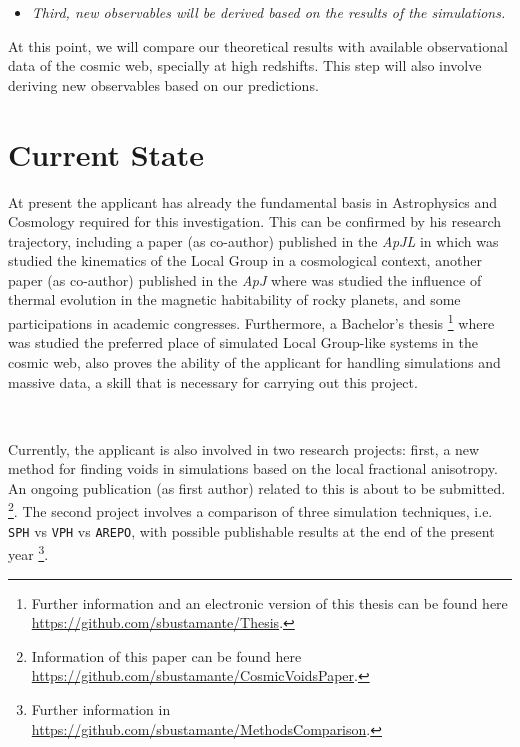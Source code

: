 \documentclass[a4,useAMS,usenatbib,usegraphicx,12pt]{article}
\begin{document}
\begin{itemize}

\item[\checkmark] \textit{Third, new observables will be derived based on the
results of the simulations. }

\end{itemize}


At this point, we will compare our theoretical results with available 
observational data of the cosmic web, specially at high redshifts. This step 
will also involve deriving new observables based on our predictions.


\section{Current State}


At present the applicant has already the fundamental basis in Astrophysics and
Cosmology required for this investigation. This can be confirmed by his research
trajectory, including a paper (as co-author) published in the \textit{ApJL} in 
which was studied the kinematics of the Local Group in a cosmological context, 
another paper (as co-author) published in the \textit{ApJ} where was studied 
the influence of thermal evolution in the magnetic habitability of rocky planets, 
and some participations in academic congresses. Furthermore, a Bachelor's thesis
\footnote{\scriptsize Further information and an electronic version of this 
thesis can be found here \url{https://github.com/sbustamante/Thesis}.} where was 
studied the preferred place of simulated Local Group-like systems in the cosmic 
web, also proves the ability of the applicant for handling simulations and massive 
data, a skill that is necessary for carrying out this project.

\

Currently, the applicant is also involved in two research projects: first, a 
new method for finding voids in simulations based on the local fractional 
anisotropy. An ongoing publication (as first author) related to this is about 
to be submitted. \footnote{\scriptsize Information of this paper can be found 
here \url{https://github.com/sbustamante/CosmicVoidsPaper}.}. The second project
involves a comparison of three simulation techniques, i.e. \texttt{SPH} vs 
\texttt{VPH} vs \texttt{AREPO}, with possible publishable results at the end of
the present year \footnote{\scriptsize Further information in  
\url{https://github.com/sbustamante/MethodsComparison}.}.
\end{document}
